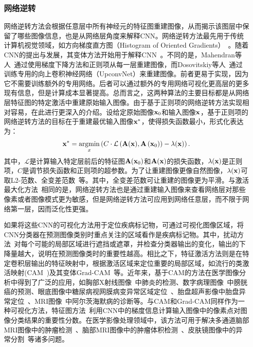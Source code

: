 \subsubsection{网络逆转}
网络逆转方法会根据任意层中所有神经元的特征图重建图像，从而揭示该图层中保留了哪些图像信息，也是从网络层角度来解释CNN。网络逆转方法最先用于传统计算机视觉领域，如方向梯度直方图（Histogram of Oriented Gradients）~\cite{dalal2005histograms}。随着CNN的提出与发展，其变体方法开始用于解释CNN~\cite{mahendran2015understanding, mahendran2016visualizing, dosovitskiy2016inverting}。不同的是，Mahendran等人~\cite{mahendran2015understanding, mahendran2016visualizing}通过使用梯度下降方法和正则项从每一层重建图像，而Dosovitskiy等人~\cite{dosovitskiy2016inverting}通过训练专用的向上卷积神经网络（UpconvNet）来重建图像。前者更易于实现，因为它不需要训练额外的专用网络。后者可以通过额外的专用网络可视化更高层的更多现有信息，但是计算成本显著提高。总而言之，这两种算法的主要目标都是从网络层特征图的特定激活中重建原始输入图像。由于基于正则项的网络逆转方法实现相对容易，在此进行更深入的介绍。设给定原始图像$\mathbf{x}_0$和输入图像$\mathbf{x}$，基于正则项的网络逆转方法的目标在于重建最优输入图像$\mathbf{x}^*$，使得损失函数最小，形式化表达为：
\begin{equation*}
\mathbf{x}^{*}=\underset{x}{\operatorname{argmin}}\left(C \cdot \mathcal{L}\left(\mathbf{A}(\mathbf{x}), \mathbf{A}\left(\mathbf{x}_{0}\right)\right)-\lambda(\mathbf{x})\right).
\end{equation*}
其中，$\mathcal{L}$是计算输入特定层前后的特征图$\mathbf{A}(\mathbf{x}_0)$和$\mathbf{A}(\mathbf{x})$的损失函数，$\lambda(\mathbf{x})$是正则项，$C$是调节损失函数和正则项的超参数。为了让重建图像更像自然图像，$\lambda(\mathbf{x})$可取L2-范数、全变差范数~\cite{rudin1992nonlinear}等。其中，全变差范数可让重建的图像更为平滑。与激活最大化方法~\cite{simonyan2013deep}相同的是，网络逆转方法也是通过重建输入图像来查看网络层对那些像素或者图像模式更为敏感，但是网络逆转方法可应用到网络任意层，而不限于网络第一层，因而泛化性更强。

如果将这些CNN的可视化方法用于定位疾病标记物，可通过可视化图像区域，将CNN分类器在预测图像类别时重点关注的区域看作是疾病标记物。其中，扰动方法~\cite{zintgraf2017visualizing}对每个可能的局部区域进行遮挡或遮罩，并检查分类器输出的变化，输出的下降量越大，说明在预测图像类时的重要性越高。相比之下，特征激活方法则是在特定卷积层输出的特征映射中，根据激活区域来定位重要的局部区域，如流行的类激活映射(CAM~\cite{zhou2016learning})及其变体Grad-CAM~\cite{selvaraju2017grad}等。近年来，基于CAM的方法在医学图像分析中得到了广泛的应用，如胸部X射线图像~\cite{rajpurkar2017chexnet}中肺炎的检测、数字病理图像~\cite{zhang2017mdnet}中膀胱癌的预测、眼底图像中糖尿病视网膜病变异常区域定位~\cite{Gondaletal17}、胎盘超声影像中胎盘异常定位~\cite{Qi2017WeaklySL}、MRI图像~\cite{yang2018visual}中阿尔茨海默病的诊断等。与CAM和Grad-CAM同样作为一种可视化方法，特征图方法~\cite{simonyan2013deep}利用CNN中的梯度信息计算输入图像中的像素点对图像分类结果的重要性分数。在医学影像处理领域中，该方法可用于解决多通道脑部MRI图像中的肿瘤检测~\cite{banerjee2016novel}、脑部MRI图像中的肿瘤体积检测~\cite{mitra2017volumetric}、皮肤镜图像中的异常分割~\cite{jahanifar2018supervised}等诸多问题。

